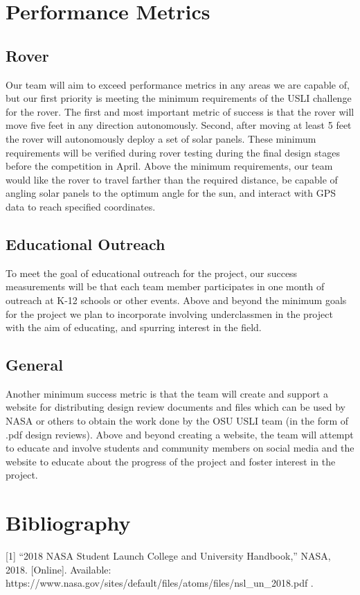 \documentclass[onecolumn, draftclsnofoot,10pt, compsoc]{IEEEtran}
\begin{document}
\section{Performance Metrics}
\subsection{Rover}
Our team will aim to exceed performance metrics in any areas we are capable of, but our first priority is meeting the minimum requirements of the USLI challenge for the rover. The first and most important metric of success is that the rover will move five feet in any direction autonomously. Second, after moving at least 5 feet the rover will autonomously deploy a set of solar panels. These minimum requirements will be verified during rover testing during the final design stages before the competition in April. Above the minimum requirements, our team would like the rover to travel farther than the required distance, be capable of angling solar panels to the optimum angle for the sun, and interact with GPS data to reach specified coordinates.
\subsection{Educational Outreach}
To meet the goal of educational outreach for the project, our success measurements will be that each team member participates in one month of outreach at K-12 schools or other events. Above and beyond the minimum goals for the project we plan to incorporate involving underclassmen in the project with the aim of educating, and spurring interest in the field. 
\subsection{General}
Another minimum success metric is that the team will create and support a website for distributing design review documents and files which can be used by NASA or others to obtain the work done by the OSU USLI team (in the form of .pdf design reviews). Above and beyond creating a website, the team will attempt to educate and involve students and community members on social media and the website to educate about the progress of the project and foster interest in the project.
\newpage
\section{Bibliography}
[1] “2018 NASA Student Launch College and University Handbook,” NASA, 2018. [Online]. Available: https://www.nasa.gov/sites/default/files/atoms/files/nsl\_un\_2018.pdf .
\end{document}
